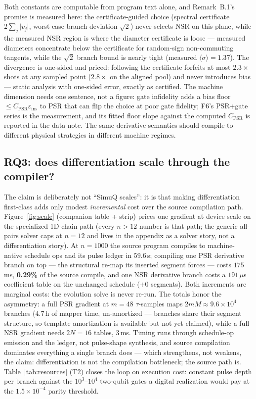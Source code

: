 Both constants are computable from program text alone, and
Remark~B.1's promise is measured here: the certificate-guided choice
(spectral certificate $2\sum_j\lvert v_j\rvert$, worst-case branch
deviation $\sqrt2$) never selects NSR on this plane, while the measured
NSR region is where the diameter certificate is loose --- measured
diameters concentrate below the certificate for random-sign non-commuting
tangents, while the $\sqrt2$ branch bound is nearly tight (measured
$\langle\sigma\rangle=1.37$). The divergence is one-sided and priced:
following the certificate forfeits at most $2.3\times$ shots at any
sampled point ($2.8\times$ on the aligned pool) and never introduces bias
--- static analysis with one-sided error, exactly as certified. The
machine dimension needs one sentence, not a figure: gate infidelity adds a
bias floor $\le C_{\mathrm{PSR}}\varepsilon_{\mathrm{ins}}$ to PSR that
can flip the choice at poor gate fidelity; F6's PSR+gate series is the
measurement, and its fitted floor slope against the computed
$C_{\mathrm{PSR}}$ is reported in the data note. The same derivative
semantics should compile to different physical strategies in different
machine regimes.

\subsection{RQ3: does differentiation scale through the compiler?}
\label{sec:eval-scale}

The claim is deliberately not ``SimuQ scales'': it is that making
differentiation first-class adds only modest \emph{incremental} cost over
the source compilation path. Figure~\ref{fig:scale} (companion table +
strip) prices one gradient at device scale on the specialized 1D-chain
path (every $n>12$ number is that path; the generic all-pairs solver caps
at $n{=}12$ and lives in the appendix as a solver story, not a
differentiation story). At $n{=}1000$ the source program compiles to
machine-native schedule ops and its pulse ledger in $59.6\,$s; compiling
one PSR derivative branch on top --- the structural re-map its inserted
segment forces --- costs $175\,$ms, \textbf{0.29\%} of the source compile,
and one NSR derivative branch costs a $191\,\mu$s coefficient table on the
unchanged schedule ($+0$ segments). Both increments are marginal costs:
the evolution solve is never re-run. The totals honor the asymmetry: a
full PSR gradient at $m{=}48$ $\tau$-samples maps $2mM\approx9.6{\times}
10^{4}$ branches ($4.7\,$h of mapper time, un-amortized --- branches share
their segment structure, so template amortization is available but not yet
claimed), while a full NSR gradient needs $2N{=}16$ tables,
$3\,$ms. Timing runs through schedule-op emission and the ledger, not
pulse-shape synthesis, and source compilation dominates everything a
single branch does --- which strengthens, not weakens, the claim:
differentiation is not the compilation bottleneck; the source path is.
Table~\ref{tab:resources} (T2) closes the loop on execution cost: constant
pulse depth per branch against the $10^{3}$--$10^{4}$ two-qubit gates a
digital realization would pay at the $1.5{\times}10^{-4}$ parity
threshold.

